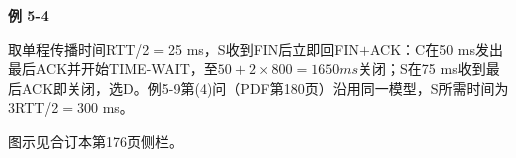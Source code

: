 {\color{ink}\bfseries 例 5-4}\par\vspace{1bp}取单程传播时间RTT/\allowbreak{}2\(=\allowbreak{}\)25 ms，S收到FIN后立即回FIN\(+\allowbreak{}\)ACK：C在50 ms发出最后ACK并开始TIME-WAIT，至\(50+\allowbreak{}2\times 800=\allowbreak{}1650 ms\)关闭；S在75 ms收到最后ACK即关闭，选D。例5-9第(4)问（PDF第180页）沿用同一模型，S所需时间为3RTT/\allowbreak{}2\(=\allowbreak{}\)300 ms。\par {\color{ink}图示见合订本第176页侧栏。}
